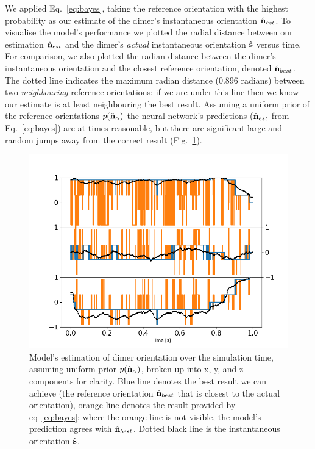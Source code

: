 We applied Eq.~\eqref{eq:bayes}, taking the reference orientation with the highest probability  as our estimate of the dimer's instantaneous orientation $\hat{\bf n}_{est}$. To visualise the model's performance  we plotted the radial distance between our estimation $\hat{\bf n}_{est}$ and the dimer's \emph{actual} instantaneous orientation $\hat{\bf s}$ versus time. For comparison, we also plotted the radian distance between the  dimer's instantaneous orientation and the closest reference orientation, denoted $\hat{\bf n}_{best}$. The dotted line indicates the maximum radian distance ($0.896$ radians) between two \textit{neighbouring} reference orientations: if we are under this line then we know our estimate is at least neighbouring the best result. Assuming a uniform prior of the reference orientations $p(\hat{\bf n}_\alpha)$  the neural network's predictions ($\hat{\bf n}_{est}$ from Eq.~\eqref{eq:bayes}) are at times reasonable, but there are significant large and random jumps away from the correct result (Fig.~\ref{fig:uniform}). 

\begin{figure}[h!]
	\centering
	\includegraphics[width=\textwidth]{fig5.png}
	\caption{Model's estimation of dimer orientation over the simulation time, assuming uniform prior $p(\hat{\bf n}_\alpha)$, broken up into x, y, and z components for clarity. Blue line denotes the best result we can achieve (the reference orientation $\hat{\bf n}_{best}$ that is closest to the actual orientation), orange line denotes the result provided by eq~\ref{eq:bayes}: where the orange line is not visible, the model's prediction agrees with $\hat{\bf n}_{best}$. Dotted black line is the instantaneous orientation $\hat{\bf s}$.}
	\label{fig:uniform}
\end{figure} 

